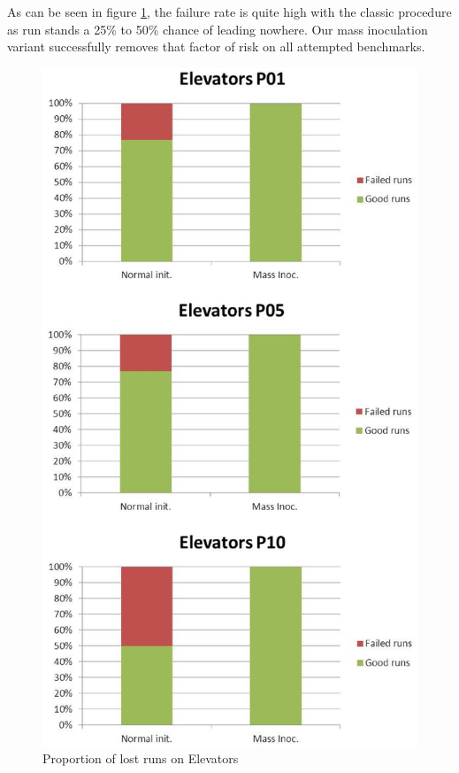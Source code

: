 \documentclass[english]{DESCARWINreport}
\newcommand{\ELEVATORS}{{\sc Elevators}}
\begin{document}
As can be seen in figure \ref{fig:failRate}, the failure rate is quite high with the classic procedure as run stands a 25\% to 50\% chance of leading nowhere. Our mass inoculation variant successfully removes that factor of risk on all attempted benchmarks.

\begin{figure}
	\centering
		\includegraphics[height=0.8\textheight]{pics/failRate_elevators.eps}
	\caption{Proportion of lost runs on \ELEVATORS}
	\label{fig:failRate}
\end{figure}
\end{document}

